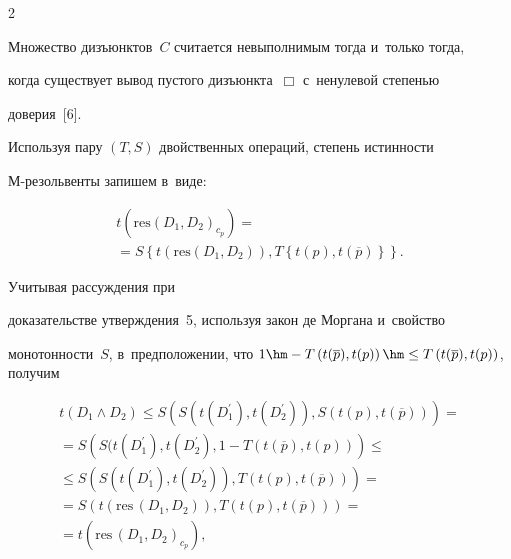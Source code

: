 \begin{multicols}{2}
  


  Множество дизъюнктов~$C$ считается невыполнимым тогда и~только тогда, 


когда существует вывод пустого дизъюнкта~$\Box$ с~ненулевой степенью 


доверия~[6].


  


  Используя пару $(T,S)$ двойственных операций, степень истинности  


М-ре\-золь\-вен\-ты запишем в~\mbox{виде}: 


\begin{multline*}


t\left(\mathrm{res}\left(D_1,D_2\right)_{c_p}\right) ={}\\


{}= S\left\{ t\left( \mathrm{res}\left(D_1, D_2\right)\right), 


T\left\{ t(p), t\left(\overline{p}\right)\right\}\right\}.


\end{multline*}


 Учитывая рассуждения при 


доказательстве утверж\-де\-ния~5, используя закон де Моргана и~свойство 


мо\-но\-тон\-ности~$S$, в~предположении, что $1\hm- T\left( t(\overline{p}), 


t(p)\right) \hm\leq T\left( t(\overline{p}), t(p)\right)$, получим


  \begin{multline*}


  t(D_1\wedge D_2) \leq S\left( S\left(t(D_1^\prime), t(D_2^\prime)\right), S(t(p), 


t(\overline{p}))\right)={}\\


  {}=


  S\left( S(t(D_1^\prime), t(D_2^\prime), 1-T(t(\overline{p}), t(p))\right)\leq{}\\


  {}\leq


  S\left( S(t(D_1^\prime), t(D_2^\prime)), T(t(p), t(\overline{p}))\right)={}\\


  {}=


  S\left( t(\mathrm{res}\,(D_1, D_2)), T(t(p), t(\overline{p}))\right)={}\\


  {}=


  t\left( \mathrm{res}\,(D_1, D_2)_{c_p}\right),



\end{multline*}
\end{multicols}

